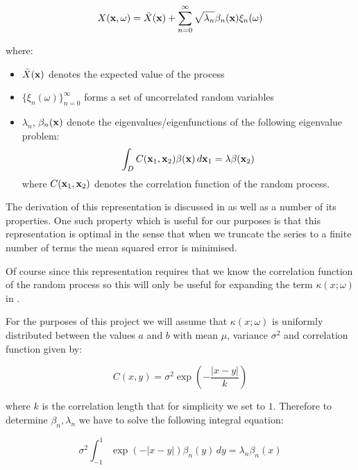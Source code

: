 \begin{equation}
    X(\mathbf{x}, \omega) = \bar{X}(\mathbf{x})
    + \sum_{n = 0}^\infty\sqrt{\lambda_n}\beta_n(\mathbf{x})\xi_n(\omega)
\end{equation}

where:

\begin{itemize}
    \item $\bar{X}(\mathbf{x})$ denotes the expected value of the process
    \item $\{\xi_n(\omega)\}_{n=0}^\infty$ forms a set of uncorrelated random
          variables
    \item $\lambda_n$, $\beta_n(\mathbf{x})$ denote the eigenvalues/eigenfunctions
          of the following eigenvalue problem:
          \[
                \int_DC(\mathbf{x}_1, \mathbf{x}_2)\beta(\mathbf{x})\, d\mathbf{x}_1
                = \lambda\beta(\mathbf{x}_2)
          \]
          where $C(\mathbf{x}_1,\mathbf{x}_2)$ denotes the correlation function of the
          random process.
\end{itemize}

The derivation of this representation is discussed in \cite{stochastic-fem} as
well as a number of its properties. One such property which is useful for our
purposes is that this representation is optimal in the sense that when we
truncate the series to a finite number of terms the mean squared error is
minimised.

Of course since this representation requires that we know the correlation
function of the random process so this will only be useful for expanding the
term $\kappa(x;\omega)$ in .

For the purposes of this project we will assume that $\kappa(x;\omega)$ is
uniformly distributed between the values $a$ and $b$ with mean $\mu$,
variance $\sigma^2$ and correlation function given by:

\begin{equation}
    C(x, y) = \sigma^2\exp\left(-\frac{|x - y|}{k}\right)
\end{equation}

where $k$ is the correlation length that for simplicity we set to $1$.
Therefore to determine $\beta_n, \lambda_n$ we have to solve the following
integral equation:

\begin{equation}\label{eq:oned-stochastic-kle-eigenvalue-problem}
    \sigma^2\int_{-1}^1\exp(-|x - y|)\beta_n(y)\, dy = \lambda_n\beta_n(x)
\end{equation}

